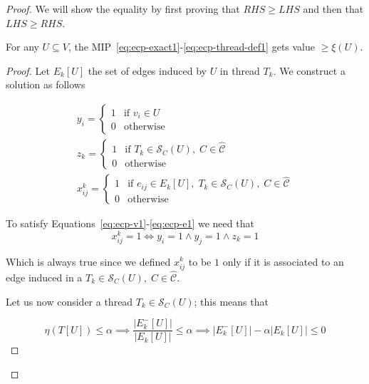 \begin{proof}
	We will show the equality by first proving that $RHS \geq LHS$ and then
	that $LHS \geq RHS$.

	\begin{claim}
		For any $U \subseteq V$, the
		MIP~\ref{eq:ecp-exact1}-\ref{eq:ecp-thread-def1} gets value $\geq \xi(U)$.
	\end{claim}

	\begin{proof}
		Let $E_k[U]$ the set of edges induced by $U$ in thread $T_k$. We construct a solution as follows

		\begin{gather}
			\label{eq:ecpp-y}
			y_i = \begin{cases}
				1 & \text{if } v_{i} \in U \\
				0 & \text{otherwise}
			\end{cases} \\
			\label{eq:ecpp-z}
			z_k = \begin{cases}
				1 & \text{if } T_{k} \in \mathcal{S}_C(U), \; C \in \mathcal{\hat{C}} \\
				0 & \text{otherwise}
			\end{cases} \\
			\label{eq:ecpp-x}
			x_{ij}^{k} = \begin{cases}
				1 & \text{if } e_{ij} \in E_{k}[U], \; T_{k} \in \mathcal{S}_C(U), \; C \in
				\mathcal{\hat{C}}                                                           \\
				0 & \text{otherwise}
			\end{cases}
		\end{gather}

		To satisfy Equations~\ref{eq:ecp-v1}-\ref{eq:ecp-e1} we need that
		\begin{equation}
			\label{eq:ecpp-x-iff}
			x_{ij}^{k} = 1 \iff y_i = 1 \land y_j = 1 \land z_k = 1
		\end{equation}

		Which is always true since we defined $x_{ij}^{k}$ to be $1$ only if it
		is associated to an edge induced in a $T_k \in \mathcal{S}_C(U), \; C \in
			\mathcal{\hat{C}} $.

		Let us now consider a thread $T_k \in \mathcal{S}_C(U)$; this means that

		\begin{equation}
			\eta(T[U]) \leq \alpha \implies \frac{|E^{-}_{k}[U]|}{|E_{k}[U]|} \leq
			\alpha \implies |E^{-}_{k}[U]| - \alpha |E_{k}[U]| \leq 0
		\end{equation}


\end{proof}
\end{proof}

